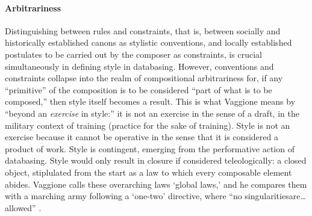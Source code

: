 \paragraph{Arbitrariness}
Distinguishing between rules and constraints, that is, between socially and historically established canons as stylistic conventions, and locally established postulates to be carried out by the composer as constraints, is crucial simultaneously in defining style in databasing. However, conventions and constraints collapse into the realm of compositional arbitrariness for, if any ``primitive'' of the composition is to be considered ``part of what is to be composed,'' then style itself becomes a result. This is what Vaggione means by ``beyond an \textit{exercise} in style:'' it is not an exercise in the sense of a draft, in the military context of training (practice for the sake of training). Style is not an exercise because it cannot be operative in the sense that it is considered a product of work. Style is contingent, emerging from the performative action of databasing. Style would only result in closure if considered teleologically: a closed object, stiplulated from the start as a law to which every composable element abides. Vaggione calls these overarching laws `global laws,' and he compares them with a marching army following a `one-two' directive, where ``no singularities\dos are\dots allowed'' \parencite[101]{Vag93:Det}.



